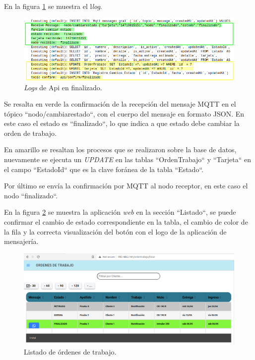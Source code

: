 En la figura \ref{fig:ensayofinalizadoapi} se muestra el l\textit{log}.

\begin{figure}[H]
	\centering
	\includegraphics[width=\textwidth]{./Figures/ensayo-1/13.finalizado-api-logs.png}
	\caption{\textit{Logs} de Api en finalizado.}
	\label{fig:ensayofinalizadoapi}
\end{figure}

Se resalta en verde la confirmación de la recepción del mensaje MQTT en el tópico ``nodo/cambiarestado``, con el cuerpo del mensaje en formato JSON. En este caso el estado es ``finalizado``, lo que indica a que estado debe cambiar la orden de trabajo.

En amarillo se resaltan los procesos que se realizaron sobre la base de datos, nuevamente se ejecuta un \textit{UPDATE} en las tablas ``OrdenTrabajo`` y ``Tarjeta`` en el campo ``EstadoId`` que es la clave foránea de la tabla ``Estado``.

Por último se envía la confirmación por MQTT al nodo receptor, en este caso el nodo ``finalizado``.

En la figura \ref{fig:ensayofinalizadolistado} se muestra la aplicación \textit{web} en la sección ``Listado``, se puede confirmar el cambio de estado correspondiente en la tabla, el cambio de color de la fila y la correcta visualización del botón con el logo de la aplicación de mensajería.

\begin{figure}[H]
	\centering
	\includegraphics[width=\textwidth]{./Figures/ensayo-1/14.finalizado-listado.png}
	\caption{Listado de órdenes de trabajo.}
	\label{fig:ensayofinalizadolistado}
\end{figure}


